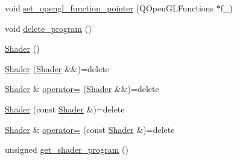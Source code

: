 \begin{DoxyCompactItemize}
void \mbox{\hyperlink{classShader_3_01RENDER__TYPE_1_1CUSTOM_01_4_a288cd57527d1f961b8daae41abc1b314}{set\+\_\+opengl\+\_\+function\+\_\+pointer}} (Q\+Open\+G\+L\+Functions $\ast$f\+\_\+)
\item 
void \mbox{\hyperlink{classShader_3_01RENDER__TYPE_1_1CUSTOM_01_4_a17a34c30e96f2f5eb2c202c8f7bcd146}{delete\+\_\+program}} ()
\item 
\mbox{\hyperlink{classShader_3_01RENDER__TYPE_1_1CUSTOM_01_4_ad1c029ec4cba7e4557c7ce19ae9e006b}{Shader}} ()
\item 
\mbox{\hyperlink{classShader_3_01RENDER__TYPE_1_1CUSTOM_01_4_a4fea53201befd8962702645fe8f2526e}{Shader}} (\mbox{\hyperlink{classShader}{Shader}} \&\&)=delete
\item 
\mbox{\hyperlink{classShader}{Shader}} \& \mbox{\hyperlink{classShader_3_01RENDER__TYPE_1_1CUSTOM_01_4_a717f92caab16604933920257707046b6}{operator=}} (\mbox{\hyperlink{classShader}{Shader}} \&\&)=delete
\item 
\mbox{\hyperlink{classShader_3_01RENDER__TYPE_1_1CUSTOM_01_4_af1fbc8b0cb20d1af7905e2d896f0fb79}{Shader}} (const \mbox{\hyperlink{classShader}{Shader}} \&)=delete
\item 
\mbox{\hyperlink{classShader}{Shader}} \& \mbox{\hyperlink{classShader_3_01RENDER__TYPE_1_1CUSTOM_01_4_a44af437f5ea044824ba7937ee07d1da7}{operator=}} (const \mbox{\hyperlink{classShader}{Shader}} \&)=delete
\item 
unsigned \mbox{\hyperlink{classShader_3_01RENDER__TYPE_1_1CUSTOM_01_4_adf4d1f7a937d11102268dfb8fc7f2f9e}{get\+\_\+shader\+\_\+program}} ()
\end{DoxyCompactItemize}
